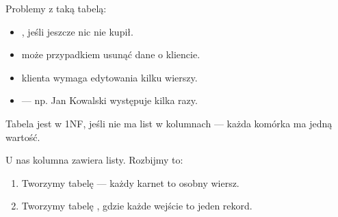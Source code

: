 \documentclass[letterpaper,10pt,polish]{sphinxmanual}
\begin{document}
\sphinxAtStartPar
Problemy z taką tabelą:
\begin{itemize}
\item {} 
\sphinxAtStartPar
{}, jeśli jeszcze nic nie kupił.

\item {} 
\sphinxAtStartPar
{} może przypadkiem usunąć dane o kliencie.

\item {} 
\sphinxAtStartPar
{} klienta wymaga edytowania kilku wierszy.

\item {} 
\sphinxAtStartPar
{} — np. Jan Kowalski występuje kilka razy.

\end{itemize}

\sphinxAtStartPar
{}

\sphinxAtStartPar
Tabela jest w 1NF, jeśli nie ma list w kolumnach — każda komórka ma jedną wartość.

\sphinxAtStartPar
U nas kolumna  zawiera listy. Rozbijmy to:
\begin{enumerate}
%
\item {} 
\sphinxAtStartPar
Tworzymy tabelę  — każdy karnet to osobny wiersz.

\item {} 
\sphinxAtStartPar
Tworzymy tabelę , gdzie każde wejście to jeden rekord.

\end{enumerate}
\end{document}
